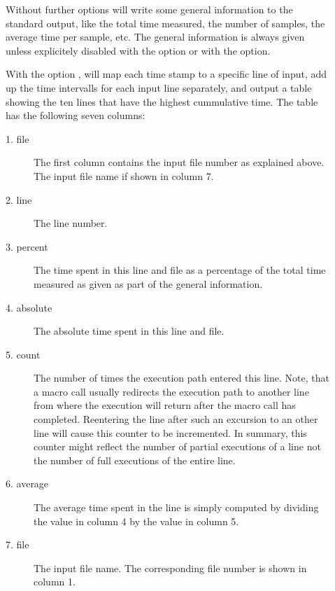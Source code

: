 \documentclass[a4paper,english]{article}
\begin{document}
\begin{description}
\item[ ]
  Without further options  will write some general
  information to the standard output, like the total time measured,
  the number of samples, the average time per sample, etc.
  The general information is always given unless explicitely disabled
  with the  option or with the  option.

\item[  ]
  With the option ,  will map each time stamp
  to a specific line of input, add up the time intervalls for each input
  line separately, and output a table showing the ten lines that have
  the highest cummulative time.
  The table has the following seven columns:
  \begin{description}
  \item[1. file]
    The first column contains the input file number as explained above.
    The input file name if shown in column 7.
  \item[2. line]
    The line number.
  \item[3. percent]
    The time spent in this line and file as a percentage of the total
    time measured as given as part of the general information.
  \item[4. absolute]
    The absolute time spent in this line and file.
  \item[5. count]
    The number of times the execution path entered this line.
    Note, that a
    macro call usually redirects the execution path to another line
    from where the execution will return after the macro call has completed.
    Reentering the line after such an excursion to an other line will
    cause this counter to be incremented. In summary, this counter might
    reflect the number of partial executions of a line not the number
    of full executions of the entire line.
  \item[6. average]
    The average time spent in the line is simply computed by dividing the
    value in column 4 by the value in column 5.
  \item[7. file]
    The input file name. The corresponding file number is shown in column 1.
  \end{description}


\end{description}
\end{document}
